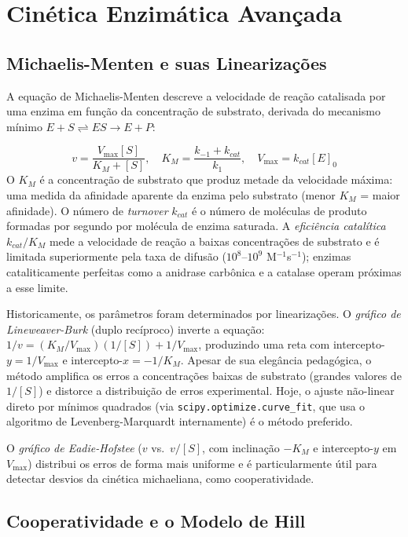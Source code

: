 \section{Cinética Enzimática Avançada}

\subsection{Michaelis-Menten e suas Linearizações}

A equação de Michaelis-Menten descreve a velocidade de reação catalisada por uma enzima
em função da concentração de substrato, derivada do mecanismo mínimo
$E + S \rightleftharpoons ES \to E + P$:

\begin{equation}
v = \frac{V_{\max}[S]}{K_M + [S]}, \quad K_M = \frac{k_{-1} + k_{cat}}{k_1}, \quad V_{\max} = k_{cat}[E]_0
\end{equation}
O $K_M$ é a concentração de substrato que produz metade da velocidade máxima: uma medida
da afinidade aparente da enzima pelo substrato (menor $K_M$ = maior afinidade). O número
de \emph{turnover} $k_{cat}$ é o número de moléculas de produto formadas por segundo por
molécula de enzima saturada. A \emph{eficiência catalítica} $k_{cat}/K_M$ mede a velocidade
de reação a baixas concentrações de substrato e é limitada superiormente pela taxa de
difusão ($10^8$--$10^9$ M$^{-1}$s$^{-1}$); enzimas cataliticamente perfeitas como a
anidrase carbônica e a catalase operam próximas a esse limite.

Historicamente, os parâmetros foram determinados por linearizações. O \emph{gráfico de
Lineweaver-Burk} (duplo recíproco) inverte a equação:
$1/v = (K_M/V_{\max})(1/[S]) + 1/V_{\max}$, produzindo uma reta com intercepto-$y =
1/V_{\max}$ e intercepto-$x = -1/K_M$. Apesar de sua elegância pedagógica, o método
amplifica os erros a concentrações baixas de substrato (grandes valores de $1/[S]$) e
distorce a distribuição de erros experimental. Hoje, o ajuste não-linear direto por
mínimos quadrados (via \texttt{scipy.optimize.curve\_fit}, que usa o algoritmo de
Levenberg-Marquardt internamente) é o método preferido.

O \emph{gráfico de Eadie-Hofstee} ($v$ vs.\ $v/[S]$, com inclinação $-K_M$ e
intercepto-$y$ em $V_{\max}$) distribui os erros de forma mais uniforme e é
particularmente útil para detectar desvios da cinética michaeliana, como cooperatividade.

\subsection{Cooperatividade e o Modelo de Hill}

